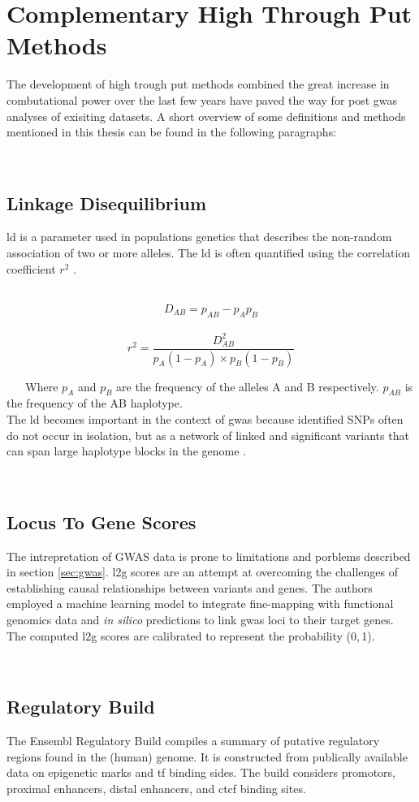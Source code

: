     \section{Complementary High Through Put Methods}
    \label{sec:bioinformatics}
    The development of high trough put methods combined the great increase in combutational power over the last few years have paved the way for post \ac{gwas} analyses of exisiting datasets. A short overview of some definitions and methods mentioned in this thesis can be found in the following paragraphs:

    \subsection{Linkage Disequilibrium}
    \label{subsec:ld}
    \Ac{ld} is a parameter used in populations genetics that describes the non-random association of two or more alleles. The \ac{ld} is often quantified using the correlation coefficient $r^2$ \cite{slatkinLinkageDisequilibriumUnderstanding2008}.

        $$ D_{AB} = p_{AB} − p_A p_B $$
        $$ r^2 = \frac{D_{AB}^2}{p_A (1-p_A) \times p_B (1-p_B)} $$

    Where $p_A$ and $p_B$ are the frequency of the alleles A and B respectively. $p_{AB}$ is the frequency of the AB haplotype.\\
    The \ac{ld} becomes important in the context of \ac{gwas} because identified SNPs often do not occur in isolation, but as a network of linked and significant variants that can span large haplotype blocks in the genome \cite{slatkinLinkageDisequilibriumUnderstanding2008}.

    \subsection{Locus To Gene Scores}
    The intrepretation of GWAS data is prone to limitations and porblems described in section \ref{sec:gwas}. \Ac{l2g} scores are an attempt at overcoming the challenges of establishing causal relationships between variants and genes. The authors employed a machine learning model to integrate fine-mapping with functional genomics data and \textit{in silico} predictions to link \ac{gwas} loci to their target genes. The computed \ac{l2g} scores are calibrated to represent the probability (0,\,1). \cite{mountjoyOpenApproachSystematically2021}

    \subsection{Regulatory Build}
    The Ensembl Regulatory Build compiles a summary of putative regulatory regions found in the (human) genome. It is constructed from publically available data on epigenetic marks and \ac{tf} binding sides. The build considers promotors, proximal enhancers, distal enhancers, and \ac{ctcf} binding sites. \cite{zerbinoEnsemblRegulatoryBuild2015}


